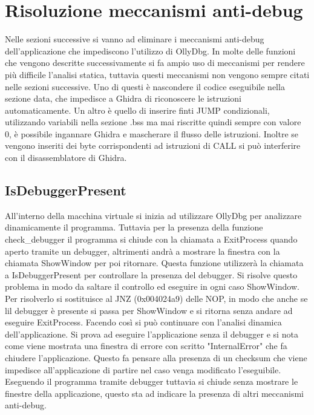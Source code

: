 \documentclass[a4paper,12pt]{article}
\begin{document}
\section{Risoluzione meccanismi anti-debug}
Nelle sezioni successive si vanno ad eliminare i meccanismi anti-debug dell'applicazione che impediscono l'utilizzo di OllyDbg. In molte delle funzioni che vengono descritte successivamente si fa ampio uso di meccanismi per rendere più difficile l'analisi statica, tuttavia questi meccanismi non vengono sempre citati nelle sezioni successive. Uno di questi è nascondere il codice eseguibile nella sezione data, che impedisce a Ghidra di riconoscere le istruzioni automaticamente. 
Un altro è quello di inserire finti JUMP condizionali, utilizzando variabili nella sezione .bss ma mai riscritte quindi sempre con valore 0, è possibile ingannare Ghidra e mascherare il flusso delle istruzioni. Inoltre se vengono inseriti dei byte corrispondenti ad istruzioni di CALL si può interferire con il disassemblatore di Ghidra.

\subsection{IsDebuggerPresent}
All'interno della macchina virtuale si inizia ad utilizzare OllyDbg per analizzare dinamicamente il programma. Tuttavia per la presenza della funzione check\_debugger il programma si chiude con la chiamata a ExitProcess quando aperto tramite un debugger, altrimenti andrà a mostrare la finestra con la chiamata ShowWindow per poi ritornare.  Questa funzione utilizzerà la chiamata a IsDebuggerPresent per controllare la presenza del debugger.
Si risolve questo problema in modo da saltare il controllo ed eseguire in ogni caso ShowWindow. Per risolverlo si sostituisce al JNZ (0x004024a9) delle NOP, in modo che anche se lil debugger è presente si passa per ShowWindow e si ritorna senza andare ad eseguire ExitProcess.
 Facendo così si può continuare con l'analisi dinamica dell'applicazione. Si prova ad eseguire l'applicazione senza il debugger e si nota come viene mostrata una finestra di errore con scritto "InternalError" che fa chiudere l'applicazione. Questo fa pensare alla presenza di un checksum che viene impedisce all'applicazione di partire nel caso venga modificato l'eseguibile.  Eseguendo il programma tramite debugger tuttavia si chiude senza mostrare le finestre della applicazione, questo sta ad indicare la presenza di altri meccanismi anti-debug. 
\end{document}
